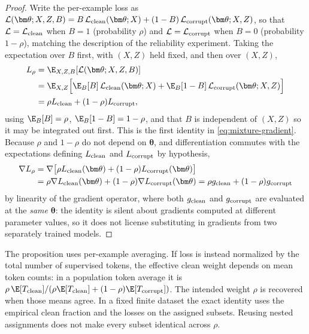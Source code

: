 \begin{proof}
Write the per-example loss as
$\mathcal L(\bm\theta;X,Z,B)=B\,\mathcal L_{\rm clean}(\bm\theta;X)+(1-B)\,\mathcal L_{\rm corrupt}(\bm\theta;X,Z)$,
so that $\mathcal L=\mathcal L_{\rm clean}$ when $B=1$ (probability $\rho$) and
$\mathcal L=\mathcal L_{\rm corrupt}$ when $B=0$ (probability $1-\rho$),
matching the description of the reliability experiment. Taking the
expectation over $B$ first, with $(X,Z)$ held fixed, and then over $(X,Z)$,
\begin{align*}
 L_\rho&=\E_{X,Z,B}[\mathcal L(\bm\theta;X,Z,B)]\\
 &=\E_{X,Z}\Bigl[\E_B[B]\,\mathcal L_{\rm clean}(\bm\theta;X)+\E_B[1-B]\,\mathcal L_{\rm corrupt}(\bm\theta;X,Z)\Bigr]\\
 &=\rho L_{\rm clean}+(1-\rho)L_{\rm corrupt},
\end{align*}
using $\E_B[B]=\rho$, $\E_B[1-B]=1-\rho$, and that $B$ is independent of
$(X,Z)$ so it may be integrated out first. This is the first identity in
\cref{eq:mixture-gradient}. Because $\rho$ and $1-\rho$ do not depend on
$\bm\theta$, and differentiation commutes with the expectations defining
$L_{\rm clean}$ and $L_{\rm corrupt}$ by hypothesis,
\begin{align*}
 \nabla L_\rho&=\nabla\bigl[\rho L_{\rm clean}(\bm\theta)+(1-\rho)L_{\rm corrupt}(\bm\theta)\bigr]\\
 &=\rho\nabla L_{\rm clean}(\bm\theta)+(1-\rho)\nabla L_{\rm corrupt}(\bm\theta)
 =\rho g_{\rm clean}+(1-\rho)g_{\rm corrupt}
\end{align*}
by linearity of the gradient operator, where both $g_{\rm clean}$ and
$g_{\rm corrupt}$ are evaluated at the \emph{same} $\bm\theta$: the identity
is silent about gradients computed at different parameter values, so it
does not license substituting in gradients from two separately trained
models.
\end{proof}

The proposition uses per-example averaging.  If loss is instead normalized by
the total number of supervised tokens, the effective clean weight depends on
mean token counts: in a population token average it is
$\rho\,\E[T_{\rm clean}]/(\rho\E[T_{\rm clean}]+(1-\rho)\E[T_{\rm corrupt}])$.
The intended weight $\rho$ is recovered when those means agree.  In a fixed
finite dataset the exact identity uses the empirical clean fraction and the
losses on the assigned subsets.  Reusing nested assignments does not make every
subset identical across $\rho$.

